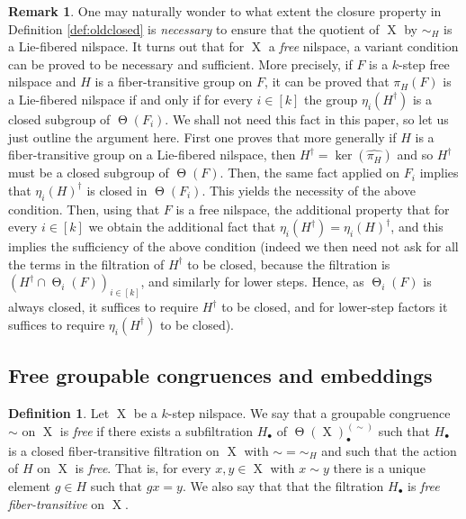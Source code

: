 \documentclass[a4paper,12pt,reqno]{amsart}
\newcommand*{\compl}[1]{#1^\dagger}
\theoremstyle{definition}
\newtheorem{defn}[theorem]{Definition}
\newtheorem{remark}[theorem]{Remark}
\newcommand{\wh}{\widehat}
\DeclareMathOperator{\tran}{\Theta}
\DeclareMathOperator{\ns}{X}
\begin{document}
\begin{remark}
One may naturally wonder to what extent the closure property in Definition \ref{def:oldclosed} is \emph{necessary} to ensure that the quotient of $\ns$ by $\sim_H$ is a Lie-fibered nilspace. It turns out that for $\ns$ a \emph{free} nilspace, a variant  condition can be proved to be necessary and sufficient. More precisely, if $F$ is a $k$-step free nilspace and $H$ is a fiber-transitive group on $F$, it can be proved that $\pi_H(F)$ is a Lie-fibered nilspace if and only if for every $i\in [k]$ the group $\eta_i(\compl{H})$ is a closed subgroup of $\tran(F_i)$. We shall not need this fact in this paper, so let us just outline the argument here. First one proves that more generally if $H$ is a fiber-transitive group on a Lie-fibered nilspace, then $\compl{H}=\ker(\wh{\pi_H})$ and so $\compl{H}$ must be a closed subgroup of $\tran(F)$. Then, the same fact applied on $F_i$ implies that $\compl{\eta_i(H)}$ is closed in $\tran(F_i)$. This yields the necessity of the above condition. Then, using that $F$ is a free nilspace, the additional property that for every $i\in [k]$ we obtain the additional fact that $\eta_i(\compl{H})=\compl{\eta_i(H)}$, and this implies the sufficiency of the above condition (indeed we then need not ask for all the terms in the filtration of ${\compl{H}}$ to be closed, because the filtration is $({\compl{H}}\cap \tran_i(F))_{i\in[k]}$, and similarly for lower steps. Hence, as $\tran_i(F)$ is always closed, it suffices to require ${\compl{H}}$ to be closed, and for lower-step factors it suffices to require $\eta_i(\compl{H})$ to be closed).
\end{remark}

\subsection{Free groupable congruences and embeddings}\hfill
\begin{defn}\label{def:free-group-cong}
Let $\ns$ be a $k$-step nilspace. We say that a groupable congruence $\sim$ on $\ns$ is \emph{free} if there exists a subfiltration $H_\bullet$ of $\tran(\ns)^{(\sim)}_\bullet$ such that $H_\bullet$ is a closed fiber-transitive filtration on $\ns$ with $\sim=\sim_H$ and such that the action of $H$ on $\ns$ is \emph{free}. That is, for every $x,y\in \ns$ with $x\sim y$ there is a unique element $g\in H$ such that $gx=y$. We also say that that the filtration $H_\bullet$ is \emph{free fiber-transitive} on $\ns$.
\end{defn}
\end{document}
